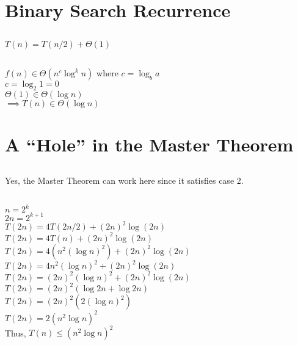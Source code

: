 \documentclass[14pt, letterpaper]{article}
\begin{document}
\section{Binary Search Recurrence}
\subsection{}
$T(n) = T(n/2) + \Theta(1)$

\subsection{}
$f(n) \in \Theta(n^c\log^k n)$ where $c = \log_b a$ \\
$c = \log_2 1 = 0$ \\
$\Theta(1) \in \Theta(\log n)$\\
$\implies T(n) \in \Theta(\log n)$

\section{A ``Hole'' in the Master Theorem}
\subsection{}
Yes, the Master Theorem can work here since it satisfies case 2.
\subsection{}
$n = 2^k$ \\
$2n = 2^{k+1}$ \\
$T(2n) = 4T(2n/2) + (2n)^2\log(2n)$ \\
$T(2n) = 4T(n) + (2n)^2\log(2n)$ \\
$T(2n) = 4(n^2(\log n)^2) + (2n)^2\log(2n)$ \\
$T(2n) = 4n^2(\log n)^2 + (2n)^2\log(2n)$ \\
$T(2n) = (2n)^2(\log n)^2 + (2n)^2\log(2n)$ \\
$T(2n) = (2n)^2(\log 2n + \log 2n)$ \\
$T(2n) = (2n)^2(2(\log n)^2)$ \\
$T(2n) = 2(n^2\log n)^2$ \\
Thus, $T(n) \leq (n^2\log n)^2$ \\
\end{document}
